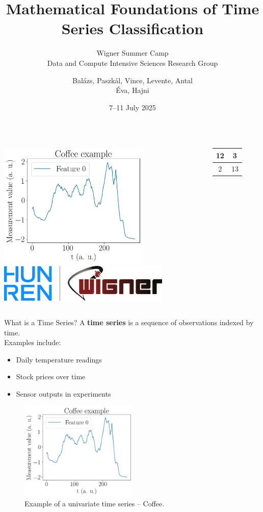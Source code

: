 \documentclass{beamer}
\title{Mathematical Foundations of Time Series Classification}
\subtitle{Wigner Summer Camp \\ Data and Compute Intensive Sciences Research Group}
\author{Bal\'azs, Paszk\'al, Vince, Levente, Antal \\ \'{E}va, Hajni}
\date{7--11 July 2025}
\begin{document}
\begin{frame}
  \titlepage
  \begin{columns}
    \centering
    \includegraphics[width=0.7\textwidth]{../img/Coffee_example.png}
    \centering
    \includegraphics[width=0.8\textwidth]{../img/logo.png}
          \begin{tabular}{|c|c|}
        \hline
          12 & 3 \\ \hline
          2 &  13 \\ \hline
      \end{tabular}
    \centering
  \end{columns}
\end{frame}

\begin{frame}{What is a Time Series?}
  A \textbf{time series} is a sequence of observations indexed by time.
  \\[1em]
  Examples include:
  \begin{itemize}
    \item Daily temperature readings
    \item Stock prices over time
    \item Sensor outputs in experiments
  \end{itemize}
  \begin{figure}[h]
    \centering
    \includegraphics[width=0.5\textwidth]{../img/Coffee_example.png}
    \caption{Example of a univariate time series -- Coffee\cite{CoffeeDataset1996}.}
  \end{figure}
\end{frame}
\end{document}
